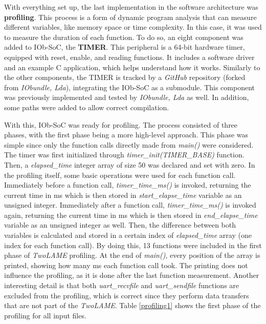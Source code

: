 With everything set up, the last implementation in the software architecture was \textbf{profiling}. This process is a form of dynamic program analysis that can measure different variables, like memory space or time complexity. In this case, it was used to measure the duration of each function.
To do so, an eight component was added to IOb-SoC, the \textbf{TIMER}. This peripheral is a 64-bit hardware timer, equipped with reset, enable, and reading functions. It includes a software driver and an example C application, which helps understand how it works. 
Similarly to the other components, the TIMER is tracked by a \textit{GitHub} repository (forked from \textit{IObundle, Lda}), integrating the IOb-SoC as a submodule. This component was previously implemented and tested by \textit{IObundle, Lda} as well. In addition, some paths were added to allow correct compilation.

With this, IOb-SoC was ready for profiling. The process consisted of three phases, with the first phase being a more high-level approach. 
This phase was simple since only the function calls directly made from \textit{main()} were considered. The timer was first initialized through \textit{timer\_init(TIMER\_BASE)} function. Then, a \textit{elapsed\_time} integer array of size 50 was declared and set with zero. In the profiling itself, some basic operations were used for each function call. Immediately before a function call, \textit{timer\_time\_ms()} is invoked, returning the current time in ms which is then stored in \textit{start\_elapse\_time} variable as an unsigned integer. Immediately after a function call, \textit{timer\_time\_ms()} is invoked again, returning the current time in ms which is then stored in \textit{end\_elapse\_time} variable as an unsigned integer as well. Then, the difference between both variables is calculated and stored in a certain index of \textit{elapsed\_time} array (one index for each function call). 
By doing this, 13 functions were included in the first phase of \textit{TwoLAME} profiling. At the end of \textit{main()}, every position of the array is printed, showing how many ms each function call took. The printing does not influence the profiling, as it is done after the last function measurement. Another interesting detail is that both \textit{uart\_recvfile} and \textit{uart\_sendfile} functions are excluded from the profiling, which is correct since they perform data transfers that are not part of the \textit{TwoLAME}.
Table \ref{profiling1} shows the first phase of the profiling for all input files.

